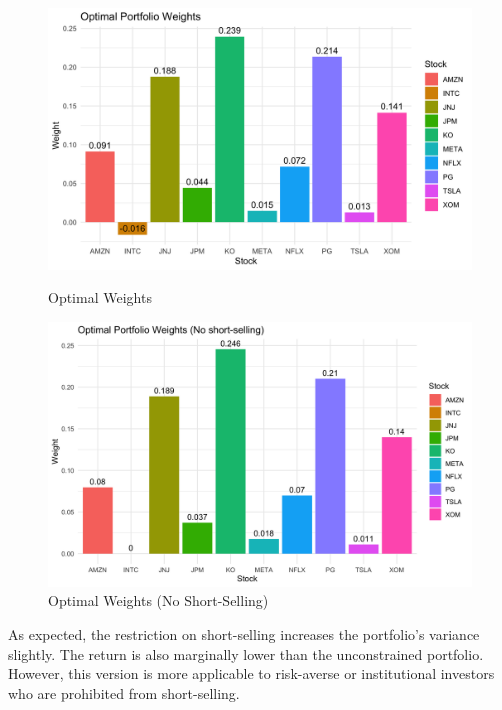 \documentclass[11pt]{article}
\begin{document}
\begin{figure}[h]
    \centering
    \begin{minipage}{0.48\textwidth}
        \centering
        \includegraphics[width=\linewidth]{Findings_Yutong/weights.png}
        \caption{Optimal Weights}
        \label{opt weights}
    \end{minipage}
    \hfill
    \begin{minipage}{0.48\textwidth}
        \centering
        \includegraphics[width=\linewidth]{Findings_Yutong/portfolio_weights_plot.png}
        \caption{Optimal Weights (No Short-Selling)}
        \label{opt weights no}
    \end{minipage}
\end{figure}
As expected, the restriction on short-selling increases the portfolio's variance slightly. The return is also marginally lower than the unconstrained portfolio. However, this version is more applicable to risk-averse or institutional investors who are prohibited from short-selling.
\end{document}

